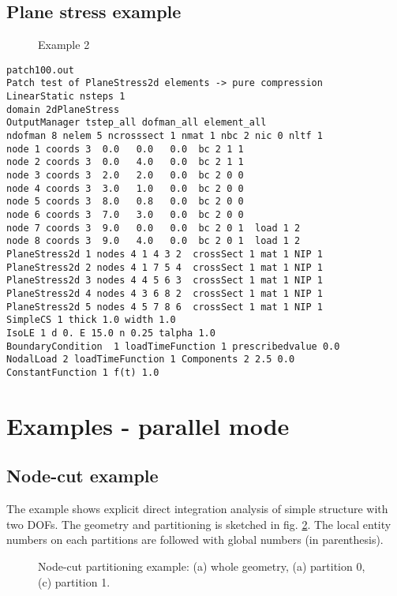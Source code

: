 \documentclass[draft]{article}
\begin{document}
\subsection {Plane stress example}
\begin{figure}[tb]
\caption{Example 2}
\label{ex02}
\end{figure}
{\small\begin{verbatim}
patch100.out
Patch test of PlaneStress2d elements -> pure compression
LinearStatic nsteps 1
domain 2dPlaneStress
OutputManager tstep_all dofman_all element_all
ndofman 8 nelem 5 ncrosssect 1 nmat 1 nbc 2 nic 0 nltf 1
node 1 coords 3  0.0   0.0   0.0  bc 2 1 1
node 2 coords 3  0.0   4.0   0.0  bc 2 1 1
node 3 coords 3  2.0   2.0   0.0  bc 2 0 0
node 4 coords 3  3.0   1.0   0.0  bc 2 0 0
node 5 coords 3  8.0   0.8   0.0  bc 2 0 0
node 6 coords 3  7.0   3.0   0.0  bc 2 0 0
node 7 coords 3  9.0   0.0   0.0  bc 2 0 1  load 1 2
node 8 coords 3  9.0   4.0   0.0  bc 2 0 1  load 1 2
PlaneStress2d 1 nodes 4 1 4 3 2  crossSect 1 mat 1 NIP 1
PlaneStress2d 2 nodes 4 1 7 5 4  crossSect 1 mat 1 NIP 1
PlaneStress2d 3 nodes 4 4 5 6 3  crossSect 1 mat 1 NIP 1
PlaneStress2d 4 nodes 4 3 6 8 2  crossSect 1 mat 1 NIP 1
PlaneStress2d 5 nodes 4 5 7 8 6  crossSect 1 mat 1 NIP 1
SimpleCS 1 thick 1.0 width 1.0
IsoLE 1 d 0. E 15.0 n 0.25 talpha 1.0
BoundaryCondition  1 loadTimeFunction 1 prescribedvalue 0.0
NodalLoad 2 loadTimeFunction 1 Components 2 2.5 0.0
ConstantFunction 1 f(t) 1.0
\end{verbatim}}


\section{Examples - parallel mode}
\subsection{Node-cut example}
The example shows explicit direct integration analysis of
simple structure with two DOFs.
The geometry and partitioning is sketched in
fig. \ref{nodecut-ex01}. The local entity numbers on each partitions
are followed with global numbers (in parenthesis).

\begin{figure}[htb]
\caption{Node-cut partitioning example: (a) whole geometry,
(a) partition 0, (c) partition 1.}
\label{nodecut-ex01}
\end{figure}
\end{document}
